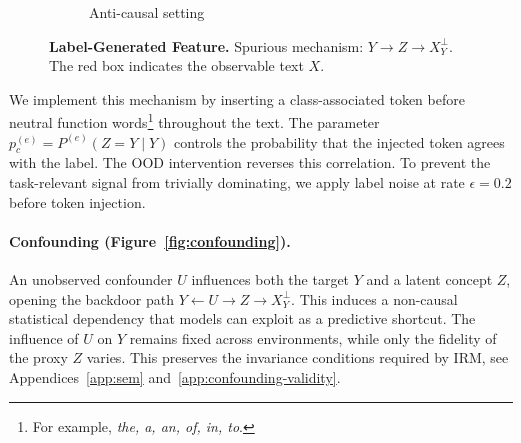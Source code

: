 \documentclass[11pt]{article}
\theoremstyle{definition}
\theoremstyle{plain}
\begin{document}
\begin{figure}[!htbp]
\begin{subfigure}[t]{0.48\linewidth}
{
        }
        \caption{Anti-causal setting}
    \end{subfigure}
    \caption{\textbf{Label-Generated Feature.} Spurious mechanism: $Y \rightarrow Z \rightarrow X^\perp_Y$. The red box indicates the observable text $X$.}
    \label{fig:label-generated}
\end{figure}

We implement this mechanism by inserting a class-associated token before neutral function words\footnote{For example, \emph{the, a, an, of, in, to}.} throughout the text. The parameter $p_c^{(e)} = P^{(e)}\!\left(Z=Y\mid Y\right)$ controls the probability that the injected token agrees with the label. The OOD intervention reverses this correlation. To prevent the task-relevant signal from trivially dominating, we apply label noise at rate $\epsilon=0.2$ before token injection.

\paragraph{Confounding (Figure~\ref{fig:confounding}).} An unobserved confounder $U$ influences both the target $Y$ and a latent concept $Z$, opening the backdoor path $Y \leftarrow U \rightarrow Z \rightarrow X_Y^{\perp}$. This induces a non-causal statistical dependency that models can exploit as a predictive shortcut. The influence of $U$ on $Y$ remains fixed across environments, while only the fidelity of the proxy $Z$ varies. This preserves the invariance conditions required by IRM, see Appendices~\ref{app:sem} and~\ref{app:confounding-validity}. 
\end{document}
